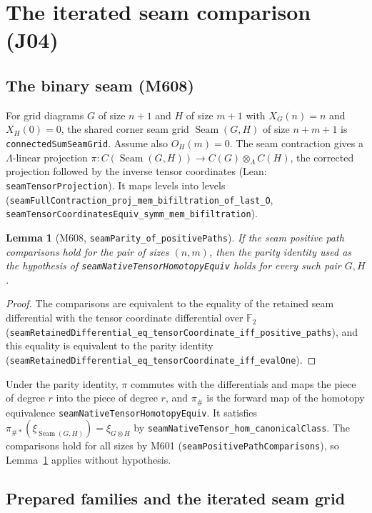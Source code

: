 \documentclass[11pt]{amsart}
\newtheorem{lemma}[theorem]{Lemma}
\theoremstyle{definition}
\theoremstyle{remark}
\newcommand{\lean}[1]{\textnormal{\nolinkurl{#1}}}
\newcommand{\Lam}{\Lambda}
\newcommand{\F}{\mathbb{F}_2}
\DeclareMathOperator{\seam}{Seam}
\begin{document}
\section{The iterated seam comparison (J04)}\label{sec:j04}

\subsection{The binary seam (M608)}
For grid diagrams $G$ of size $n+1$ and $H$ of size $m+1$ with $X_G(n)=n$ and $X_H(0)=0$, the
shared corner seam grid $\seam(G,H)$ of size $n+m+1$ is \lean{connectedSumSeamGrid}. Assume also
$O_H(m)=0$. The seam contraction gives a $\Lam$-linear projection
$\pi\colon C(\seam(G,H))\to C(G)\otimes_\Lam C(H)$, the corrected projection followed by the inverse
tensor coordinates (Lean: \lean{seamTensorProjection}). It maps levels into levels
(\lean{seamFullContraction_proj_mem_bifiltration_of_last_O},
\lean{seamTensorCoordinatesEquiv_symm_mem_bifiltration}).

\begin{lemma}[M608, \lean{seamParity_of_positivePaths}]\label{lem:m608}
If the seam positive path comparisons hold for the pair of sizes $(n,m)$, then the parity identity
used as the hypothesis of \lean{seamNativeTensorHomotopyEquiv} holds for every such pair $G,H$.
\end{lemma}

\begin{proof}
The comparisons are equivalent to the equality of the retained seam differential with the
tensor coordinate differential over $\F$
(\lean{seamRetainedDifferential_eq_tensorCoordinate_iff_positive_paths}), and this equality is
equivalent to the parity identity (\lean{seamRetainedDifferential_eq_tensorCoordinate_iff_evalOne}).
\end{proof}

Under the parity identity, $\pi$ commutes with the differentials and maps the piece of degree $r$
into the piece of degree $r$, and $\pi_\#$ is the forward map of the homotopy equivalence
\lean{seamNativeTensorHomotopyEquiv}. It satisfies $\pi_{\#*}(\xi_{\seam(G,H)})=\xi_{G\otimes H}$
by \lean{seamNativeTensor_hom_canonicalClass}. The comparisons hold for all sizes by M601
(\lean{seamPositivePathComparisons}), so Lemma~\ref{lem:m608} applies without hypothesis.

\subsection{Prepared families and the iterated seam grid}
\end{document}
